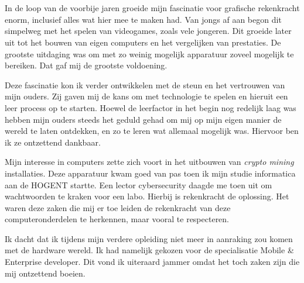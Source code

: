 
\chapter*{}%
\label{ch:voorwoord}


In de loop van de voorbije jaren groeide mijn fascinatie voor grafische rekenkracht enorm, inclusief alles wat hier mee te maken had. Van jongs af aan begon dit simpelweg met het spelen van videogames, zoals vele jongeren. Dit groeide later uit tot het bouwen van eigen computers en het vergelijken van prestaties. De grootste uitdaging was om met zo weinig mogelijk apparatuur zoveel mogelijk te bereiken. Dat gaf mij de grootste voldoening. 

\bigbreak{}

Deze fascinatie kon ik verder ontwikkelen met de steun en het vertrouwen van mijn ouders. Zij gaven mij de kans om met technologie te spelen en hieruit een leer process op te starten. Hoewel de leerfactor in het begin nog redelijk laag was hebben mijn ouders steeds het geduld gehad om mij op mijn eigen manier de wereld te laten ontdekken, en zo te leren wat allemaal mogelijk was. Hiervoor ben ik ze ontzettend dankbaar.

\bigbreak{}

Mijn interesse in computers zette zich voort in het uitbouwen van \textit{crypto mining} installaties. Deze apparatuur kwam goed van pas toen ik mijn studie informatica aan de HOGENT startte. Een lector cybersecurity daagde me toen uit om wachtwoorden te kraken voor een labo. Hierbij is rekenkracht de oplossing. Het waren deze zaken die mij er toe leiden de rekenkracht van deze com\-pu\-ter\-on\-der\-de\-len te herkennen, maar vooral te respecteren. 

\bigbreak{}

Ik dacht dat ik tijdens mijn verdere opleiding niet meer in aanraking zou komen met de hardware wereld. Ik had namelijk gekozen voor de specialisatie Mobile \& Enterprise developer. Dit vond ik uiteraard jammer omdat het toch zaken zijn die mij ontzettend boeien.

